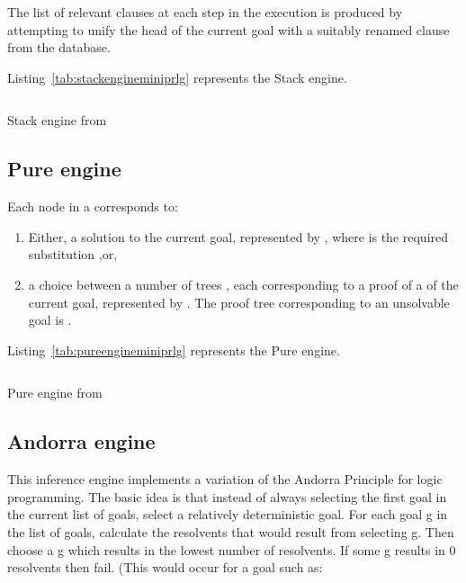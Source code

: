\documentclass[thesis-solanki.tex]{files}
\begin{document}
The list of relevant clauses at each step in the execution is produced by attempting to unify the head of the current goal with a suitably
renamed clause from the database.

Listing~\ref{tab:stackengineminiprlg} represents the Stack engine.

\begin{code-list}[H]
\begin{singlespace}
\inputminted[linenos, firstline=29, lastline=56]{haskell}{haskell-proto3-sudsy-woe.hs}
\end{singlespace}
\caption{Stack engine from \cite{website:mini-prolog-hugs98}}
\label{tab:stackengineminiprlg}
\end{code-list}

\subsection{Pure engine}
 Each node in a  corresponds to:
\begin{enumerate}
\item Either, a solution to the current goal, represented by , where  is the required 
 substitution ,or,
 
\item a choice between a number of trees , each corresponding to a proof of a  of the current 
goal, represented by . 
The proof tree corresponding to an unsolvable goal is . 
\end{enumerate}

Listing~\ref{tab:pureengineminiprlg} represents the Pure engine.

\begin{code-list}[H]
\begin{singlespace}
\inputminted[linenos, firstline=26, lastline=46]{haskell}{haskell-proto3-absurd-silicon.hs}
\end{singlespace}
\caption{Pure engine from \cite{website:mini-prolog-hugs98}}
\label{tab:pureengineminiprlg}
\end{code-list}

\subsection{Andorra engine}
This inference engine implements a variation of the Andorra Principle for
  logic programming. The basic
  idea is that instead of always selecting the first goal in the current
  list of goals, select a relatively deterministic goal.
For each goal g in the list of goals, calculate the resolvents that would
result from selecting g.  Then choose a g which results in the lowest
number of resolvents.  If some g results in 0 resolvents then fail.
(This would occur for a goal such as:  
\end{document}
